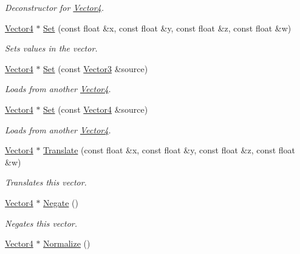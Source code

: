 \begin{DoxyCompactItemize}
\begin{DoxyCompactList}\small\item\em Deconstructor for \hyperlink{class_flounder_1_1_vector4}{Vector4}. \end{DoxyCompactList}\item 
\hyperlink{class_flounder_1_1_vector4}{Vector4} $\ast$ \hyperlink{class_flounder_1_1_vector4_a4ec2327b50365694fab4666d4c2fc87b}{Set} (const float \&x, const float \&y, const float \&z, const float \&w)
\begin{DoxyCompactList}\small\item\em Sets values in the vector. \end{DoxyCompactList}\item 
\hyperlink{class_flounder_1_1_vector4}{Vector4} $\ast$ \hyperlink{class_flounder_1_1_vector4_ad491004d944b1a0e62e3b7fd8147e5e7}{Set} (const \hyperlink{class_flounder_1_1_vector3}{Vector3} \&source)
\begin{DoxyCompactList}\small\item\em Loads from another \hyperlink{class_flounder_1_1_vector4}{Vector4}. \end{DoxyCompactList}\item 
\hyperlink{class_flounder_1_1_vector4}{Vector4} $\ast$ \hyperlink{class_flounder_1_1_vector4_ae966c1d652aec7571beb9407ed106ddc}{Set} (const \hyperlink{class_flounder_1_1_vector4}{Vector4} \&source)
\begin{DoxyCompactList}\small\item\em Loads from another \hyperlink{class_flounder_1_1_vector4}{Vector4}. \end{DoxyCompactList}\item 
\hyperlink{class_flounder_1_1_vector4}{Vector4} $\ast$ \hyperlink{class_flounder_1_1_vector4_a179683f8e4d411d16817d32cae7f6e0e}{Translate} (const float \&x, const float \&y, const float \&z, const float \&w)
\begin{DoxyCompactList}\small\item\em Translates this vector. \end{DoxyCompactList}\item 
\hyperlink{class_flounder_1_1_vector4}{Vector4} $\ast$ \hyperlink{class_flounder_1_1_vector4_af6951719c4399059502dac2ff92e3bfe}{Negate} ()
\begin{DoxyCompactList}\small\item\em Negates this vector. \end{DoxyCompactList}\item 
\hyperlink{class_flounder_1_1_vector4}{Vector4} $\ast$ \hyperlink{class_flounder_1_1_vector4_a3943e5d0788b928c87e9e0b38dac2f61}{Normalize} ()

\end{DoxyCompactItemize}
